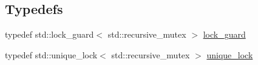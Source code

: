 \subsection*{Typedefs}
\begin{DoxyCompactItemize}
\item 
typedef std\+::lock\+\_\+guard$<$ std\+::recursive\+\_\+mutex $>$ \mbox{\hyperlink{group__plugin_ga191dd2c1abfed2baaa71d79dcaf19566}{lock\+\_\+guard}}
\item 
typedef std\+::unique\+\_\+lock$<$ std\+::recursive\+\_\+mutex $>$ \mbox{\hyperlink{group__plugin_gaf461fd7bb3ba3755cdbd6129141f8cca}{unique\+\_\+lock}}
\end{DoxyCompactItemize}
